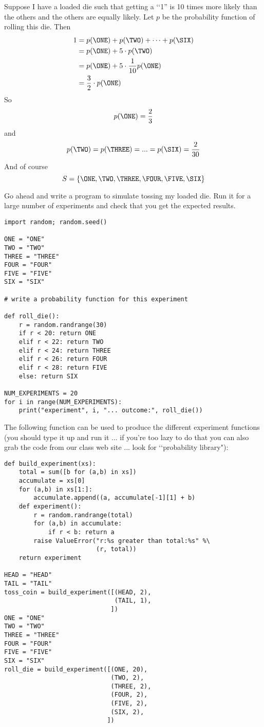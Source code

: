 \begin{eg}
Suppose I have a loaded die such that getting a \lq\lq 1'' 
is 10 times more likely 
than the others and the others are equally likely.
Let $p$ be the probability function of rolling this die.
Then
\begin{align*}
1 
&= p(\ONE) + p(\TWO) + \cdots + p(\SIX) \\
&= p(\ONE) + 5 \cdot p(\TWO) \\
&= p(\ONE) + 5 \cdot \frac{1}{10} p(\ONE) \\
&= \frac{3}{2} \cdot p(\ONE) 
\end{align*}
So 
\[
p(\ONE) = \frac{2}{3}
\]
and 
\[
p(\TWO) = p(\THREE) = ... = p(\SIX) = \frac{2}{30}
\]
And of course
\[
S = \{\ONE, \TWO, \THREE, \FOUR, \FIVE, \SIX\}
\]

Go ahead and write a program to simulate tossing my loaded die.
Run it for a large number of experiments and check that you get the
expected results. 
\begin{Verbatim}[fontsize=\small, frame=single]
import random; random.seed()

ONE = "ONE"
TWO = "TWO"
THREE = "THREE"
FOUR = "FOUR"
FIVE = "FIVE"
SIX = "SIX"

# write a probability function for this experiment

def roll_die():
    r = random.randrange(30)
    if r < 20: return ONE
    elif r < 22: return TWO
    elif r < 24: return THREE
    elif r < 26: return FOUR
    elif r < 28: return FIVE
    else: return SIX

NUM_EXPERIMENTS = 20
for i in range(NUM_EXPERIMENTS):
    print("experiment", i, "... outcome:", roll_die())
\end{Verbatim}
\end{eg}


The following function can be used to produce the different
experiment functions (you should type it up and run it ... if you're
too lazy to do that you can also grab the code from
our class web site ... look for \lq\lq probability library"):
\begin{Verbatim}[frame=single, fontsize=\small]
def build_experiment(xs):
    total = sum([b for (a,b) in xs])
    accumulate = xs[0]
    for (a,b) in xs[1:]:
        accumulate.append((a, accumulate[-1][1] + b)
    def experiment():
        r = random.randrange(total)
        for (a,b) in accumulate:
            if r < b: return a
        raise ValueError("r:%s greater than total:%s" %\
                         (r, total))
    return experiment

HEAD = "HEAD"
TAIL = "TAIL"
toss_coin = build_experiment([(HEAD, 2),
                              (TAIL, 1),
                             ])
ONE = "ONE"
TWO = "TWO"
THREE = "THREE"
FOUR = "FOUR"
FIVE = "FIVE"
SIX = "SIX"
roll_die = build_experiment([(ONE, 20),
                             (TWO, 2),
                             (THREE, 2),
                             (FOUR, 2),
                             (FIVE, 2),
                             (SIX, 2),
                            ])
\end{Verbatim}

